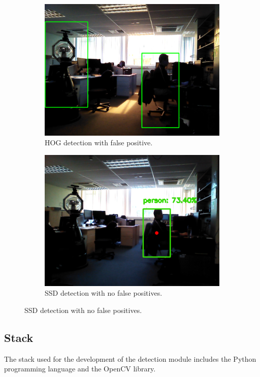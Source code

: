 \begin{figure}[H]
    \begin{subfigure}{.5\textwidth}
        \centering
        \includegraphics[width=.8\linewidth]{images/chapter3_hog.png}
        \caption{HOG detection with false positive.}
	\end{subfigure}
    \begin{subfigure}{.5\textwidth}
        \centering
        \includegraphics[width=.8\linewidth]{images/chapter3_dnn.png}
        \caption{SSD detection with no false positives.}
	\end{subfigure}
    \label{fig:hog}
\end{figure}

\subsection{Stack}

The stack used for the development of the detection module includes the Python programming language and the OpenCV library.

